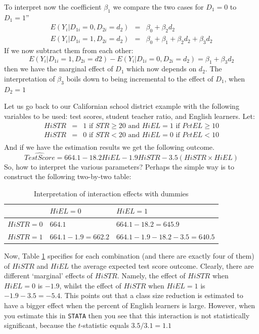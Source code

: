 \documentclass[
]{book}
\begin{document}
To interpret now the coefficient \(\beta_1\) we compare the two cases for \(D_1=0\) to \(D_1=1\)''
\begin{eqnarray}
E(Y_i|D_{1i}=0, D_{2i}=d_2) &=& \beta_0 + \beta_2 d_2 \\
E(Y_i|D_{1i}=1, D_{2i}=d_2) &=& \beta_0 + \beta_1 + \beta_2 d_2 + \beta_3 d_2 
\end{eqnarray}
If we now subtract them from each other:
\begin{equation}
E(Y_i|D_{1i}=1, D_{2i}=d2) - E(Y_i|D_{1i}=0, D_{2i}=d_2) = \beta_1 + \beta_3 d_2
\end{equation}
then we have the marginal effect of \(D_1\) which now depends on \(d_2\). The interpretation of \(\beta_3\) boils down to being incremental to the effect of \(D_1\), when \(D_2 = 1\)

Let us go back to our Californian school district example with the following variables to be used: test scores, student teacher ratio, and English learners. Let:
\begin{eqnarray}
HiSTR &=& 1 \text{ if } STR \geq 20 \text{ and } HiEL = 1 \text{ if }
PctEL \geq 10 \\
HiSTR &=& 0 \text{ if } STR < 20 \text{ and } HiEL = 0 \text{ if }
PctEL < 10 \\
\end{eqnarray}
And if we have the estimation results we get the following outcome.
\begin{equation}
\widehat{TestScore} = 664.1 - 18.2 HiEL - 1.9 HiSTR - 3.5(HiSTR \times
HiEL)
\end{equation}
So, how to interpret the various parameters? Perhaps the simple way is to construct the following two-by-two table:

\begin{table}

\caption{\label{tab:intdummies}Interpretation of interaction effects with dummies}
\centering
\begin{tabular}[t]{lll}
\toprule
 & $HiEL = 0$ & $HiEL = 1$\\
\midrule
$HiSTR = 0$ & $664.1$ & $664.1 - 18.2 = 645.9$\\
$HiSTR = 1$ & $664.1 - 1.9 = 662.2$ & $664.1 - 1.9 - 18.2 - 3.5= 640.5$\\
\bottomrule
\end{tabular}
\end{table}

Now, Table \ref{tab:intdummies} specifies for each combination (and there are exactly four of them) of \(HiSTR\) and \(HiEL\) the average expected test score outcome. Clearly, there are different `marginal' effects of \(HiSTR\). Namely, the effect of \(HiSTR\) when \(HiEL = 0\) is \(-1.9\), whilst the effect of \(HiSTR\) when \(HiEL = 1\) is \(-1.9 - 3.5 = -5.4\). This points out that a class size reduction is estimated to have a bigger effect when the percent of English learners is large. However, when you estimate this in \texttt{STATA} then you see that this interaction is not statistically significant, because the \(t\)-statistic equals \(3.5/3.1 = 1.1\)
\end{document}
